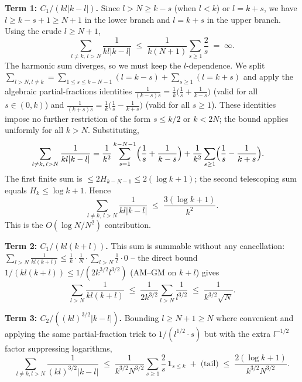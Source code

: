 \textbf{Term 1: $C_{1}/(kl|k-l|)$.}  Since $l > N \geq k - s$ (when
$l < k$) or $l = k+s$, we have $l \geq k - s + 1 \geq N + 1$ in the
lower branch and $l = k+s$ in the upper branch.  Using the crude
$l \geq N+1$,
\[
   \sum_{l \ne k,\, l > N} \frac{1}{kl|k-l|}
   \;\leq\;
   \frac{1}{k(N+1)} \sum_{s \geq 1} \frac{2}{s}
   \;=\; \infty.
\]
The harmonic sum diverges, so we must keep the $l$-dependence.
We split $\sum_{l > N, l\ne k} = \sum_{1 \leq s \leq k-N-1}
(l = k - s) + \sum_{s \geq 1}(l = k+s)$ and apply the algebraic
partial-fractions identities
$\tfrac{1}{(k-s)s} = \tfrac{1}{k}\bigl(\tfrac{1}{s}+\tfrac{1}{k-s}\bigr)$
(valid for all $s \in (0, k)$) and
$\tfrac{1}{(k+s)s} = \tfrac{1}{k}\bigl(\tfrac{1}{s}-\tfrac{1}{k+s}\bigr)$
(valid for all $s \geq 1$).  These identities impose no further
restriction of the form $s \leq k/2$ or $k < 2N$; the bound
applies uniformly for all $k > N$.  Substituting,
\begin{align*}
   \sum_{l \ne k,\, l > N} \frac{1}{kl|k-l|}
   &= \frac{1}{k^{2}}\sum_{s=1}^{k-N-1}
       \Bigl(\frac{1}{s} + \frac{1}{k-s}\Bigr)
   + \frac{1}{k^{2}}\sum_{s \geq 1}
       \Bigl(\frac{1}{s} - \frac{1}{k+s}\Bigr).
\end{align*}
The first finite sum is $\leq 2 H_{k-N-1} \leq 2(\log k + 1)$;
the second telescoping sum equals $H_{k} \leq \log k + 1$.  Hence
\begin{equation}\label{eq:partial-frac-sum}
   \sum_{l \ne k,\, l > N} \frac{1}{kl|k-l|}
   \;\leq\;
   \frac{3(\log k + 1)}{k^{2}}.
\end{equation}
This is the $O(\log N / N^{2})$ contribution.

\textbf{Term 2: $C_{1}/(kl(k+l))$.}  This sum is summable without any
cancellation:
$\sum_{l > N} \frac{1}{kl(k+l)} \leq \frac{1}{k}\cdot
\frac{1}{N}\cdot\sum_{l > N}\frac{1}{l} \cdot 0$ -- the direct bound
$1/(kl(k+l)) \leq 1/(2k^{3/2}l^{3/2})$ (AM--GM on $k+l$) gives
\begin{equation}\label{eq:term2-bound}
   \sum_{l > N}\frac{1}{kl(k+l)}
   \;\leq\;
   \frac{1}{2 k^{3/2}}\sum_{l > N}\frac{1}{l^{3/2}}
   \;\leq\;
   \frac{1}{k^{3/2}\sqrt{N}}.
\end{equation}

\textbf{Term 3: $C_{2}/((kl)^{3/2}|k-l|)$.}  Bounding $l \geq N+1
\geq N$ where convenient and applying the same partial-fraction trick
to $1/(l^{1/2}\cdot s)$ but with the extra $l^{-1/2}$ factor
suppressing logarithms,
\begin{equation}\label{eq:term3-bound}
   \sum_{l \ne k, l > N}\frac{1}{(kl)^{3/2}|k-l|}
   \;\leq\;
   \frac{1}{k^{3/2} N^{3/2}}\sum_{s \geq 1}\frac{2}{s}\,
        \mathbf{1}_{s \leq k}
   \;+\; \text{(tail)}
   \;\leq\;
   \frac{2(\log k + 1)}{k^{3/2} N^{3/2}}.
\end{equation}

